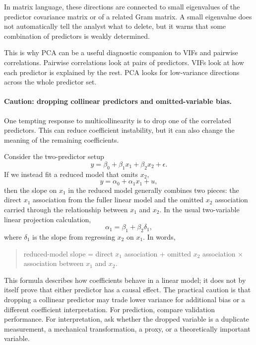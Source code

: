 In matrix language, these directions are connected to small eigenvalues of the predictor covariance matrix or of a related Gram matrix.  A small eigenvalue does not automatically tell the analyst what to delete, but it warns that some combination of predictors is weakly determined.

This is why PCA can be a useful diagnostic companion to VIFs and pairwise correlations.  Pairwise correlations look at pairs of predictors.  VIFs look at how each predictor is explained by the rest.  PCA looks for low-variance directions across the whole predictor set.

\paragraph{Caution: dropping collinear predictors and omitted-variable bias.}
One tempting response to multicollinearity is to drop one of the correlated predictors.  This can reduce coefficient instability, but it can also change the meaning of the remaining coefficients.

Consider the two-predictor setup
\begin{equation}
  y=\beta_0+\beta_1 x_1+\beta_2 x_2+\epsilon.
  \label{eq:ch16-ovb-full}
\end{equation}
If we instead fit a reduced model that omits \(x_2\),
\begin{equation}
  y=\alpha_0+\alpha_1 x_1+u,
  \label{eq:ch16-ovb-reduced}
\end{equation}
then the slope on \(x_1\) in the reduced model generally combines two pieces: the direct \(x_1\) association from the fuller linear model and the omitted \(x_2\) association carried through the relationship between \(x_1\) and \(x_2\).  In the usual two-variable linear projection calculation,
\begin{equation}
  \alpha_1=\beta_1+\beta_2\delta_1,
  \label{eq:ch16-ovb-two-predictor}
\end{equation}
where \(\delta_1\) is the slope from regressing \(x_2\) on \(x_1\).  In words,
\begin{quote}
  reduced-model slope = direct \(x_1\) association + omitted \(x_2\) association \(\times\) association between \(x_1\) and \(x_2\).
\end{quote}
This formula describes how coefficients behave in a linear model; it does not by itself prove that either predictor has a causal effect.  The practical caution is that dropping a collinear predictor may trade lower variance for additional bias or a different coefficient interpretation.  For prediction, compare validation performance.  For interpretation, ask whether the dropped variable is a duplicate measurement, a mechanical transformation, a proxy, or a theoretically important variable.

